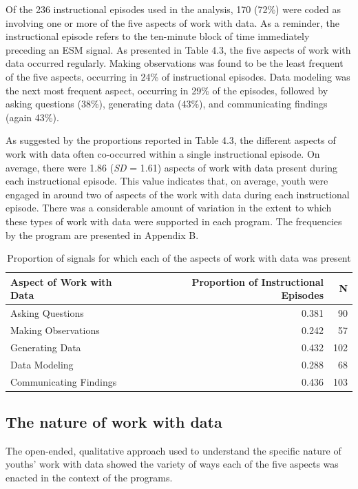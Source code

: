 \documentclass[]{msu-thesis}
\theoremstyle{definition}
\theoremstyle{definition}
\theoremstyle{definition}
\theoremstyle{remark}
\begin{document}
Of the 236 instructional episodes used in the analysis, 170 (72\%) were
coded as involving one or more of the five aspects of work with data. As
a reminder, the instructional episode refers to the ten-minute block of
time immediately preceding an ESM signal. As presented in Table 4.3, the
five aspects of work with data occurred regularly. Making observations
was found to be the least frequent of the five aspects, occurring in
24\% of instructional episodes. Data modeling was the next most frequent
aspect, occurring in 29\% of the episodes, followed by asking questions
(38\%), generating data (43\%), and communicating findings (again 43\%).

As suggested by the proportions reported in Table 4.3, the different
aspects of work with data often co-occurred within a single
instructional episode. On average, there were 1.86 (\emph{SD} = 1.61)
aspects of work with data present during each instructional episode.
This value indicates that, on average, youth were engaged in around two
of aspects of the work with data during each instructional episode.
There was a considerable amount of variation in the extent to which
these types of work with data were supported in each program. The
frequencies by the program are presented in Appendix B.

\begin{table}

\caption{\label{tab:unnamed-chunk-9}Proportion of signals for which each of the aspects of work with data was present}
\centering
\begin{tabular}[t]{lrr}
\toprule
Aspect of Work with Data & Proportion of Instructional Episodes & N\\
\midrule
Asking Questions & 0.381 & 90\\
Making Observations & 0.242 & 57\\
Generating Data & 0.432 & 102\\
Data Modeling & 0.288 & 68\\
Communicating Findings & 0.436 & 103\\
\bottomrule
\end{tabular}
\end{table}

\subsection{The nature of work with
data}\label{the-nature-of-work-with-data}

The open-ended, qualitative approach used to understand the specific
nature of youths' work with data showed the variety of ways each of the
five aspects was enacted in the context of the programs.
\end{document}
